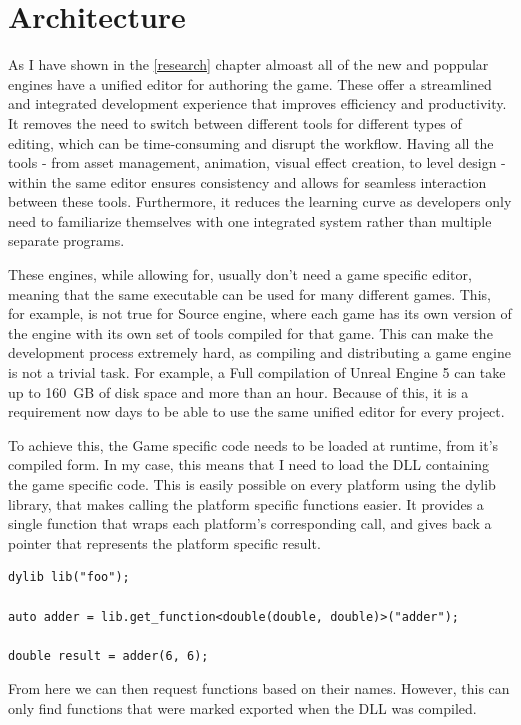 \chapter{Architecture}

As I have shown in the \ref{research} chapter almoast all of the new and poppular engines have a unified editor for authoring the game. These offer a streamlined and integrated development experience that improves efficiency and productivity.  It removes the need to switch between different tools for different types of editing, which can be time-consuming and disrupt the workflow. Having all the tools - from asset management, animation, visual effect creation, to level design - within the same editor ensures consistency and allows for seamless interaction between these tools. Furthermore, it reduces the learning curve as developers only need to familiarize themselves with one integrated system rather than multiple separate programs.

These engines, while allowing for, usually don't need a game specific editor, meaning that the same executable can be used for many different games. This, for example, is not true for Source engine, where each game has its own version of the engine with its own set of tools compiled for that game. This can make the development process extremely hard, as compiling and distributing a game engine is not a trivial task. For example, a Full compilation of Unreal Engine 5 can take up to 160 GB of disk space and more than an hour. Because of this, it is a requirement now days to be able to use the same unified editor for every project.

To achieve this, the Game specific code needs to be loaded at runtime, from it's compiled form. In my case, this means that I need to load the DLL containing the game specific code. This is easily possible on every platform using the dylib \cite{dylib} library, that makes calling the platform specific functions easier. It provides a single function that wraps each platform's corresponding call, and gives back a pointer that represents the platform specific result.

\begin{verbatim}
dylib lib("foo");

auto adder = lib.get_function<double(double, double)>("adder");

double result = adder(6, 6);
\end{verbatim}

From here we can then request functions based on their names. However, this can only find functions that were marked exported when the DLL was compiled.

